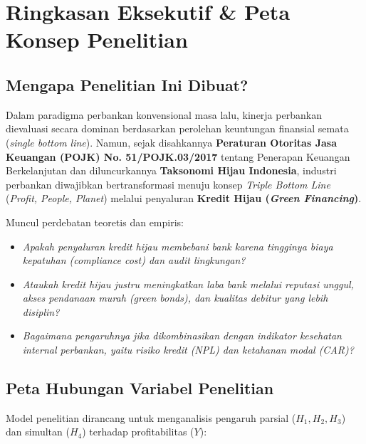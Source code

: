 \documentclass[11pt,a4paper]{article}
\begin{document}
\section{Ringkasan Eksekutif \& Peta Konsep Penelitian}

\subsection{Mengapa Penelitian Ini Dibuat?}
Dalam paradigma perbankan konvensional masa lalu, kinerja perbankan dievaluasi secara dominan berdasarkan perolehan keuntungan finansial semata (\textit{single bottom line}). Namun, sejak disahkannya \textbf{Peraturan Otoritas Jasa Keuangan (POJK) No. 51/POJK.03/2017} tentang Penerapan Keuangan Berkelanjutan dan diluncurkannya \textbf{Taksonomi Hijau Indonesia}, industri perbankan diwajibkan bertransformasi menuju konsep \textit{Triple Bottom Line} (\textit{Profit, People, Planet}) melalui penyaluran \textbf{Kredit Hijau (\textit{Green Financing})}.

Muncul perdebatan teoretis dan empiris:
\begin{itemize}
    \item \textit{Apakah penyaluran kredit hijau membebani bank karena tingginya biaya kepatuhan (compliance cost) dan audit lingkungan?}
    \item \textit{Ataukah kredit hijau justru meningkatkan laba bank melalui reputasi unggul, akses pendanaan murah (green bonds), dan kualitas debitur yang lebih disiplin?}
    \item \textit{Bagaimana pengaruhnya jika dikombinasikan dengan indikator kesehatan internal perbankan, yaitu risiko kredit (NPL) dan ketahanan modal (CAR)?}
\end{itemize}

\subsection{Peta Hubungan Variabel Penelitian}
Model penelitian dirancang untuk menganalisis pengaruh parsial ($H_1, H_2, H_3$) dan simultan ($H_4$) terhadap profitabilitas ($Y$):
\end{document}
